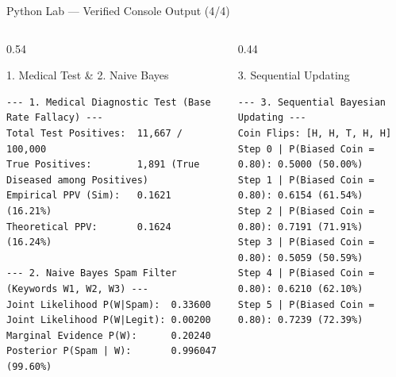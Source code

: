 \documentclass[10pt, aspectratio=169]{beamer}
\begin{document}
\begin{frame}[fragile]{Python Lab --- Verified Console Output (4/4)}
  \vspace{-0.1cm}
  \begin{columns}[T]
    \begin{column}{0.54\textwidth}
      \begin{block}{1. Medical Test \& 2. Naive Bayes}
        \fontsize{4.4pt}{5.2pt}\selectfont
\begin{verbatim}
--- 1. Medical Diagnostic Test (Base Rate Fallacy) ---
Total Test Positives:  11,667 / 100,000
True Positives:        1,891 (True Diseased among Positives)
Empirical PPV (Sim):   0.1621 (16.21%)
Theoretical PPV:       0.1624 (16.24%)

--- 2. Naive Bayes Spam Filter (Keywords W1, W2, W3) ---
Joint Likelihood P(W|Spam):  0.33600
Joint Likelihood P(W|Legit): 0.00200
Marginal Evidence P(W):      0.20240
Posterior P(Spam | W):       0.996047 (99.60%)
\end{verbatim}
      \end{block}
    \end{column}
    \begin{column}{0.44\textwidth}
      \begin{block}{3. Sequential Updating}
        \fontsize{4.4pt}{5.2pt}\selectfont
\begin{verbatim}
--- 3. Sequential Bayesian Updating ---
Coin Flips: [H, H, T, H, H]
Step 0 | P(Biased Coin = 0.80): 0.5000 (50.00%)
Step 1 | P(Biased Coin = 0.80): 0.6154 (61.54%)
Step 2 | P(Biased Coin = 0.80): 0.7191 (71.91%)
Step 3 | P(Biased Coin = 0.80): 0.5059 (50.59%)
Step 4 | P(Biased Coin = 0.80): 0.6210 (62.10%)
Step 5 | P(Biased Coin = 0.80): 0.7239 (72.39%)
\end{verbatim}
      \end{block}
    \end{column}
  \end{columns}
\end{frame}
\end{document}
